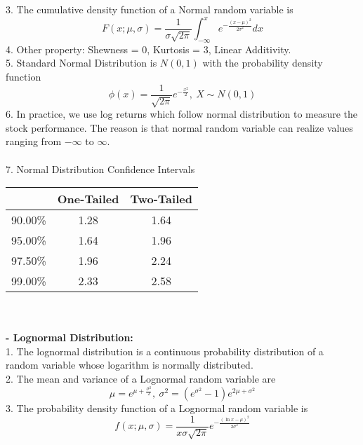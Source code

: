 \documentclass{article}
\begin{document}
\begin{enumerate}[S1 - ]
\begin{equation*}
    \end{equation*}
    3. The cumulative density function of a Normal random variable is
    \begin{equation*}
    F(x;\mu,\sigma) = \frac{1}{\sigma\sqrt{2\pi}} \int_{-\infty}^{x} e^{-\frac{(x-\mu)^2}{2\sigma^2}} dx
    \end{equation*}
    4. Other property: Shewness = 0, Kurtosis = 3, Linear Additivity.\\
    5. Standard Normal Distribution is $N(0,1)$ with the probability density function
    \begin{equation*}
    \phi(x) = \frac{1}{\sqrt{2\pi}}e^{-\frac{x^2}{2}}, \ X\sim N(0,1)
    \end{equation*}
    6. In practice, we use log returns which follow normal distribution to measure the stock performance. The reason is that normal random variable can realize values ranging from $-\infty$ to $\infty$.\\
    \\
    7. Normal Distribution Confidence Intervals\\
    \begin{table}[!hbp]
    \centering
    \begin{tabular}{ccc}
    \hline
    & One-Tailed & Two-Tailed\\
    \hline
    90.00\% & 1.28 & 1.64\\
    95.00\% & 1.64 & 1.96\\
    97.50\% & 1.96 & 2.24\\
    99.00\% & 2.33 & 2.58\\
    \hline
    \end{tabular}
    \end{table}\\
    \\
    \textbf{- Lognormal Distribution:}\\
    1. The lognormal distribution is a continuous probability distribution of a random variable whose logarithm is normally distributed.\\
    2. The mean and variance of a Lognormal random variable are
    \begin{equation*}
    \mu = e^{\mu+\frac{\sigma^2}{2}}, \ \sigma^2 = (e^{\sigma^2}-1)e^{2\mu+\sigma^2}
    \end{equation*}
    3. The probability density function of a Lognormal random variable is
    \begin{equation*}
    f(x;\mu,\sigma) = \frac{1}{x\sigma\sqrt{2\pi}}e^{-\frac{(\ln x-\mu)^2}{2\sigma^2}}

\end{equation*}
\end{enumerate}
\end{document}
